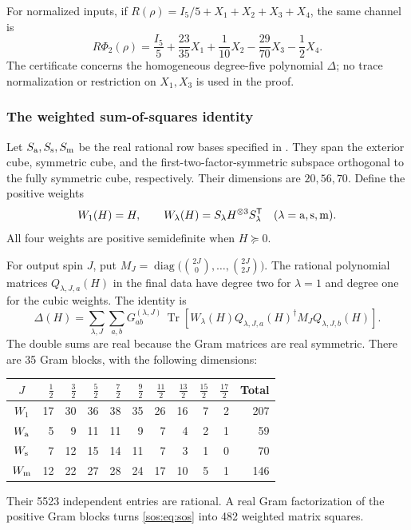 \documentclass[11pt,a4paper]{article}
\newcommand{\Tr}{\operatorname{Tr}}
\newcommand{\diag}{\operatorname{diag}}
\begin{document}
For normalized inputs, if $R(\rho)=I_5/5+X_1+X_2+X_3+X_4$, the same channel is
\[
 R\Phi_2(\rho)=\frac{I_5}{5}+\frac{23}{35}X_1+\frac1{10}X_2
                 -\frac{29}{70}X_3-\frac12X_4.
\]
The certificate concerns the homogeneous degree-five polynomial $\Delta$;
no trace normalization or restriction on $X_1,X_3$ is used in the proof.

\subsubsection{The weighted sum-of-squares identity}
Let $S_{\rm a},S_{\rm s},S_{\rm m}$ be the real rational row bases specified in
. They span the exterior cube, symmetric cube, and
the first-two-factor-symmetric subspace orthogonal to the fully symmetric
cube, respectively. Their dimensions are $20,56,70$.
Define the positive weights
\[
 W_1(H)=H,\qquad
 W_\lambda(H)=S_\lambda H^{\otimes3}S_\lambda^{\mathsf T}
 \quad(\lambda={\rm a,s,m}).
\]
All four weights are positive semidefinite when $H\succeq0$.

For output spin $J$, put
$M_J=\diag\bigl(\binom{2J}0,\ldots,\binom{2J}{2J}\bigr)$.
The rational polynomial matrices $Q_{\lambda,J,a}(H)$ in the final data have
degree two for $\lambda=1$ and degree one for the cubic weights. The identity is
\begin{equation}\label{sos:eq:sos}
 \boxed{\displaystyle
 \Delta(H)=\sum_{\lambda,J}\sum_{a,b}
 G^{(\lambda,J)}_{ab}\,
 \Tr\!\left[W_\lambda(H)
 Q_{\lambda,J,a}(H)^\dagger M_JQ_{\lambda,J,b}(H)\right].}
\end{equation}
The double sums are real because the Gram matrices are real symmetric.
There are 35 Gram blocks, with the following dimensions:
\begin{center}
\begin{tabular}{c|rrrrrrrrr|r}
\toprule
$J$ & $\frac12$&$\frac32$&$\frac52$&$\frac72$&$\frac92$&$\frac{11}2$&$\frac{13}2$&$\frac{15}2$&$\frac{17}2$& Total\\
\midrule
$W_1$ &17&30&36&38&35&26&16&7&2&207\\
$W_{\rm a}$ &5&9&11&11&9&7&4&2&1&59\\
$W_{\rm s}$ &7&12&15&14&11&7&3&1&0&70\\
$W_{\rm m}$ &12&22&27&28&24&17&10&5&1&146\\
\bottomrule
\end{tabular}
\end{center}
Their 5523 independent entries are rational. A real Gram factorization of
the positive Gram blocks turns \eqref{sos:eq:sos} into 482 weighted matrix squares.
\end{document}
